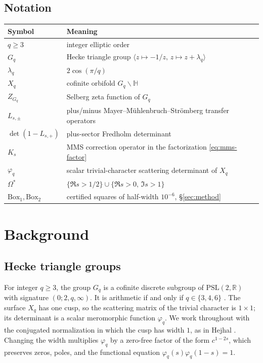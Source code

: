 \documentclass[11pt]{amsart}
\theoremstyle{definition}
\theoremstyle{remark}
\newcommand{\Gq}{G_q}
\newcommand{\phiq}{\varphi_q}
\newcommand{\Zq}{Z_{G_q}}
\newcommand{\detp}{\det(1-L_{s,+})}
\begin{document}
\subsection*{Notation}
\begin{center}
\small
\begin{tabular}{@{}>{\raggedright\arraybackslash}p{}
>{\raggedright\arraybackslash}p{}@{}}
\hline
Symbol & Meaning \\
\hline
$q\ge 3$ & integer elliptic order \\
$\Gq$ & Hecke triangle group $\langle z\mapsto-1/z,\, z\mapsto z+\lambda_q\rangle$ \\
$\lambda_q$ & $2\cos(\pi/q)$ \\
$X_q$ & cofinite orbifold $\Gq\backslash\mathbb H$ \\
$\Zq$ & Selberg zeta function of $\Gq$ \\
$L_{s,\pm}$ & plus/minus Mayer--M\"uhlenbruch--Str\"omberg transfer operators \\
$\detp$ & plus-sector Fredholm determinant \\
$K_s$ & MMS correction operator in the factorization \eqref{eq:mms-factor} \\
$\phiq$ & scalar trivial-character scattering determinant of $X_q$ \\
$\Omega^*$ & $\{\Re s>1/2\}\cup\{\Re s>0,\,\Im s>1\}$ \\
$\mathrm{Box}_1,\mathrm{Box}_2$ & certified squares of half-width $10^{-6}$, \S\ref{sec:method} \\
\hline
\end{tabular}
\end{center}

\section{Background}
\label{sec:background}

\subsection{Hecke triangle groups}
\label{sec:hecke}

For integer $q\ge 3$, the group $\Gq$ is a cofinite discrete subgroup
of $\mathrm{PSL}(2,\mathbb R)$ with signature $(0;2,q,\infty)$. It is
arithmetic if and only if $q\in\{3,4,6\}$ \cite{Takeuchi1977}. The
surface $X_q$ has one cusp, so the scattering matrix of the trivial
character is $1\times 1$; its determinant is a scalar meromorphic
function $\phiq$. We work throughout with the conjugated
normalization in which the cusp has width $1$, as in Hejhal
\cite[Ch.~7]{Hejhal1983}. Changing the width multiplies $\phiq$ by a
zero-free factor of the form $c^{1-2s}$, which preserves zeros, poles,
and the functional equation $\phiq(s)\phiq(1-s)=1$.
\end{document}
